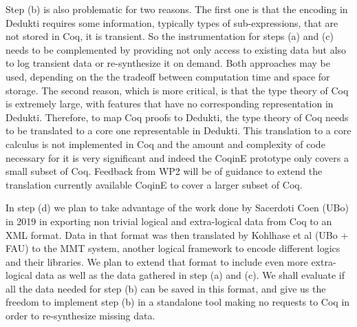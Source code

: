 Step (b) is also problematic for two reasons. The first one is that the encoding
in Dedukti requires some information, typically types of sub-expressions, that
are not stored in Coq, it is transient. So the instrumentation for steps (a) and
(c) needs to be complemented by providing not only access to existing data but
also to log transient data or re-synthesize it on demand. Both approaches may
be used, depending on the the tradeoff between computation time and space for
storage. The second reason, which is more critical, is
that the type theory of Coq is extremely large, with
features  that have no corresponding representation in Dedukti. Therefore,
to map Coq proofs to Dedukti, the type theory of Coq needs to be translated
to a core one representable in Dedukti.
This translation to a core calculus is not implemented in Coq and the amount and
complexity of code necessary for it is very significant and indeed the CoqinE
prototype only covers a small subset of Coq. Feedback from WP2 will be of
guidance to extend the translation currently available CoqinE to cover a larger
subset of Coq.

In step (d) we plan to take advantage of the work done by Sacerdoti Coen (UBo)
in 2019 in exporting non trivial logical and extra-logical data from Coq to
an XML format. Data in that format was then translated by Kohlhase et al
(UBo + FAU) to the MMT system, another logical framework to encode different
logics and their libraries. We plan to extend that format to include even
more extra-logical data as well as the data gathered in step (a) and (c). We shall
evaluate if all the data needed for step (b) can be saved in this format, and
give us the freedom to implement step (b) in a standalone tool making no
requests to Coq in order to re-synthesize missing data.


